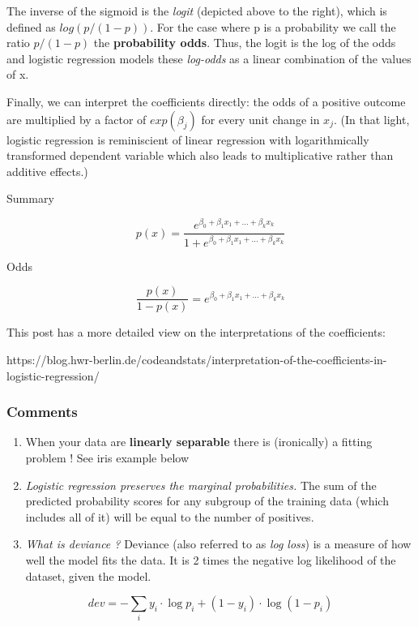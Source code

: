 \documentclass[
  letterpaper,
  DIV=11,
  numbers=noendperiod]{scrreprt}
\begin{document}
The inverse of the sigmoid is the \emph{logit} (depicted above to the
right), which is defined as \(log(p/(1-p))\). For the case where p is a
probability we call the ratio \(p/(1-p)\) the \textbf{probability odds}.
Thus, the logit is the log of the odds and logistic regression models
these \emph{log-odds} as a linear combination of the values of x.

Finally, we can interpret the coefficients directly: the odds of a
positive outcome are multiplied by a factor of \(exp(\beta_j)\) for
every unit change in \(x_j\). (In that light, logistic regression is
reminiscient of linear regression with logarithmically transformed
dependent variable which also leads to multiplicative rather than
additive effects.)

Summary

\[
p(x) = \frac{e^{\beta_0 + \beta_1 x_1 + \ldots + \beta_k x_k}}{1 + e^{\beta_0 + \beta_1 x_1 + \ldots + \beta_k x_k}}
\]

Odds

\[
\frac{p(x)}{1-p(x)} = e^{\beta_0 + \beta_1 x_1 + \ldots + \beta_k x_k}
\]

This post has a more detailed view on the interpretations of the
coefficients:

https://blog.hwr-berlin.de/codeandstats/interpretation-of-the-coefficients-in-logistic-regression/

\hypertarget{comments}{%
\subsubsection{Comments}\label{comments}}

\begin{enumerate}
\def\labelenumi{\arabic{enumi}.}
\item
  When your data are \textbf{linearly separable} there is (ironically) a
  fitting problem ! See iris example below
\item
  \emph{Logistic regression preserves the marginal probabilities.} The
  sum of the predicted probability scores for any subgroup of the
  training data (which includes all of it) will be equal to the number
  of positives.
\item
  \emph{What is deviance ?} Deviance (also referred to as \emph{log
  loss}) is a measure of how well the model fits the data. It is 2 times
  the negative log likelihood of the dataset, given the model.
\end{enumerate}

\[
dev = - \sum_i{y_i \cdot \log p_i + (1-y_i) \cdot \log (1-p_i)}
\]
\end{document}
